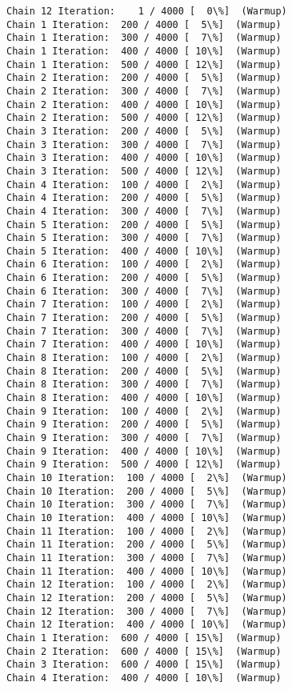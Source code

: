 \documentclass[11pt]{article}
\begin{document}
    \begin{Verbatim}[commandchars=\\\{\}]
Chain 12 Iteration:    1 / 4000 [  0\%]  (Warmup)
Chain 1 Iteration:  200 / 4000 [  5\%]  (Warmup)
Chain 1 Iteration:  300 / 4000 [  7\%]  (Warmup)
Chain 1 Iteration:  400 / 4000 [ 10\%]  (Warmup)
Chain 1 Iteration:  500 / 4000 [ 12\%]  (Warmup)
Chain 2 Iteration:  200 / 4000 [  5\%]  (Warmup)
Chain 2 Iteration:  300 / 4000 [  7\%]  (Warmup)
Chain 2 Iteration:  400 / 4000 [ 10\%]  (Warmup)
Chain 2 Iteration:  500 / 4000 [ 12\%]  (Warmup)
Chain 3 Iteration:  200 / 4000 [  5\%]  (Warmup)
Chain 3 Iteration:  300 / 4000 [  7\%]  (Warmup)
Chain 3 Iteration:  400 / 4000 [ 10\%]  (Warmup)
Chain 3 Iteration:  500 / 4000 [ 12\%]  (Warmup)
Chain 4 Iteration:  100 / 4000 [  2\%]  (Warmup)
Chain 4 Iteration:  200 / 4000 [  5\%]  (Warmup)
Chain 4 Iteration:  300 / 4000 [  7\%]  (Warmup)
Chain 5 Iteration:  200 / 4000 [  5\%]  (Warmup)
Chain 5 Iteration:  300 / 4000 [  7\%]  (Warmup)
Chain 5 Iteration:  400 / 4000 [ 10\%]  (Warmup)
Chain 6 Iteration:  100 / 4000 [  2\%]  (Warmup)
Chain 6 Iteration:  200 / 4000 [  5\%]  (Warmup)
Chain 6 Iteration:  300 / 4000 [  7\%]  (Warmup)
Chain 7 Iteration:  100 / 4000 [  2\%]  (Warmup)
Chain 7 Iteration:  200 / 4000 [  5\%]  (Warmup)
Chain 7 Iteration:  300 / 4000 [  7\%]  (Warmup)
Chain 7 Iteration:  400 / 4000 [ 10\%]  (Warmup)
Chain 8 Iteration:  100 / 4000 [  2\%]  (Warmup)
Chain 8 Iteration:  200 / 4000 [  5\%]  (Warmup)
Chain 8 Iteration:  300 / 4000 [  7\%]  (Warmup)
Chain 8 Iteration:  400 / 4000 [ 10\%]  (Warmup)
Chain 9 Iteration:  100 / 4000 [  2\%]  (Warmup)
Chain 9 Iteration:  200 / 4000 [  5\%]  (Warmup)
Chain 9 Iteration:  300 / 4000 [  7\%]  (Warmup)
Chain 9 Iteration:  400 / 4000 [ 10\%]  (Warmup)
Chain 9 Iteration:  500 / 4000 [ 12\%]  (Warmup)
Chain 10 Iteration:  100 / 4000 [  2\%]  (Warmup)
Chain 10 Iteration:  200 / 4000 [  5\%]  (Warmup)
Chain 10 Iteration:  300 / 4000 [  7\%]  (Warmup)
Chain 10 Iteration:  400 / 4000 [ 10\%]  (Warmup)
Chain 11 Iteration:  100 / 4000 [  2\%]  (Warmup)
Chain 11 Iteration:  200 / 4000 [  5\%]  (Warmup)
Chain 11 Iteration:  300 / 4000 [  7\%]  (Warmup)
Chain 11 Iteration:  400 / 4000 [ 10\%]  (Warmup)
Chain 12 Iteration:  100 / 4000 [  2\%]  (Warmup)
Chain 12 Iteration:  200 / 4000 [  5\%]  (Warmup)
Chain 12 Iteration:  300 / 4000 [  7\%]  (Warmup)
Chain 12 Iteration:  400 / 4000 [ 10\%]  (Warmup)
Chain 1 Iteration:  600 / 4000 [ 15\%]  (Warmup)
Chain 2 Iteration:  600 / 4000 [ 15\%]  (Warmup)
Chain 3 Iteration:  600 / 4000 [ 15\%]  (Warmup)
Chain 4 Iteration:  400 / 4000 [ 10\%]  (Warmup)

\end{Verbatim}
\end{document}
